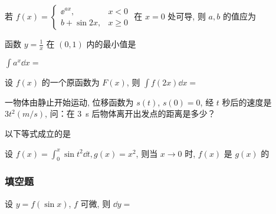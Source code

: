 \begin{ti}[3 分]
	若 $f(x) = \begin{cases}
		\ee^{ax}, & x < 0 \\
		b + \sin 2x, & x \geqslant 0
	\end{cases}$ 在 $x = 0$ 处可导, 则 $a,b$ 的值应为 \kuo
\end{ti}

\begin{ti}[3 分]
	函数 $y = \frac{1}{x}$ 在 $(0,1)$ 内的最小值是 \kuo
\end{ti}

\begin{ti}[3 分]
	$\int a^{x} \dd{x} = $ \kuo
\end{ti}

\begin{ti}[3 分]
	设 $f(x)$ 的一个原函数为 $F(x)$, 则 $\int f(2x) \dd{x} = $ \kuo
\end{ti}

\begin{ti}[3 分]
	一物体由静止开始运动, 位移函数为 $s(t)$, $s(0) = 0$, 经 $t$ 秒后的速度是 $3t^{2} (\si{m/s})$, 问：在 \SI{3}{s} 后物体离开出发点的距离是多少？\kuo
\end{ti}

\begin{ti}[3 分]
	以下等式成立的是 \kuo
\end{ti}

\begin{ti}
	设 $f(x) = \int_{0}^{x} \sin t^{2} \dd{t}, g(x) = x^{2}$, 则当 $x \to 0$ 时, $f(x)$ 是 $g(x)$ 的 \kuo
\end{ti}

\subsubsection{填空题}
\begin{ti}[3 分]
	设 $y = f(\sin x)$, $f$ 可微, 则 $\dd{y} = $ \hua
\end{ti}

